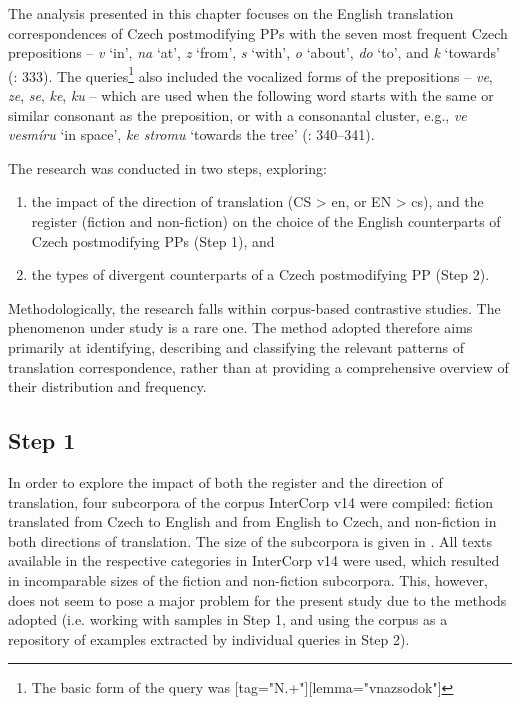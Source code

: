 \documentclass[output=paper]{langscibook}
\begin{document}
The analysis presented in this chapter focuses on the English translation correspondences of Czech postmodifying PPs with the seven most frequent Czech prepositions – \textit{v} ‘in’, \textit{na} ‘at’, \textit{z} ‘from’, \textit{s} ‘with’, \textit{o} ‘about’, \textit{do} ‘to’, and \textit{k} ‘towards’ (\citealt{CvrčekEtAl2010}: 333). The queries\footnote{The basic form of the query was [tag="N.+"][lemma="v{\textbar}na{\textbar}z{\textbar}s{\textbar}o{\textbar}do{\textbar}k"]} also included the vocalized forms of the prepositions – \textit{ve}, \textit{ze}, \textit{se}, \textit{ke}, \textit{ku} – which are used when the following word starts with the same or similar consonant as the preposition, or with a consonantal cluster, e.g., \textit{ve vesmíru} ‘in space’, \textit{ke stromu} ‘towards the tree’ (\citealt{CvrčekEtAl2010}: 340–341).

The research was conducted in two steps, exploring:

\begin{enumerate}
  \item the impact of the direction of translation (CS > en, or EN > cs), and the register (fiction and non-fiction) on the choice of the English counterparts of Czech postmodifying PPs (Step 1), and
\item the types of divergent counterparts of a Czech postmodifying PP (Step 2).
\end{enumerate}

Methodologically, the research falls within corpus-based contrastive studies. The phenomenon under study is a rare one. The method adopted therefore aims primarily at identifying, describing and classifying the relevant patterns of translation correspondence, rather than at providing a comprehensive overview of their distribution and frequency.

\subsection{Step 1}

In order to explore the impact of both the register and the direction of translation, four subcorpora of the corpus InterCorp v14 were compiled: fiction translated from Czech to English and from English to Czech, and non-fiction in both directions of translation. The size of the subcorpora is given in . All texts available in the respective categories in InterCorp v14 were used, which resulted in incomparable sizes of the fiction and non-fiction subcorpora. This, however, does not seem to pose a major problem for the present study due to the methods adopted (i.e. working with samples in Step 1, and using the corpus as a repository of examples extracted by individual queries in Step 2).
\end{document}
